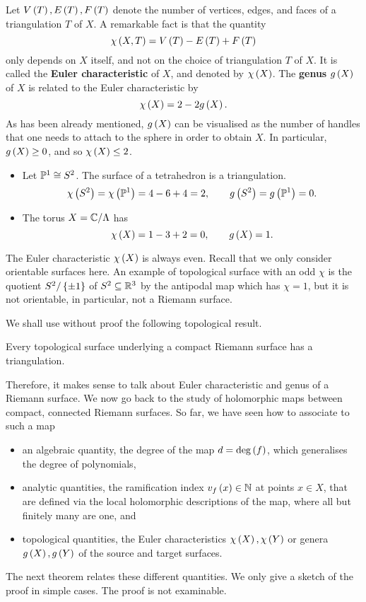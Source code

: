 Let $ V\rb{T}, E\rb{T}, F\rb{T} $ denote the number of vertices, edges, and faces of a triangulation $ T $ of $ X $. A remarkable fact is that the quantity
$$ \chi\rb{X, T} = V\rb{T} - E\rb{T} + F\rb{T} $$
only depends on $ X $ itself, and not on the choice of triangulation $ T $ of $ X $. It is called the \textbf{Euler characteristic} of $ X $, and denoted by $ \chi\rb{X} $. The \textbf{genus} $ g\rb{X} $ of $ X $ is related to the Euler characteristic by
$$ \chi\rb{X} = 2 - 2g\rb{X}. $$
As has been already mentioned, $ g\rb{X} $ can be visualised as the number of handles that one needs to attach to the sphere in order to obtain $ X $. In particular, $ g\rb{X} \ge 0 $, and so $ \chi\rb{X} \le 2 $.

\begin{example*}
\hfill
\begin{itemize}
\item Let $ \P^1 \cong S^2 $. The surface of a tetrahedron is a triangulation.
$$ \chi\rb{S^2} = \chi\rb{\P^1} = 4 - 6 + 4 = 2, \qquad g\rb{S^2} = g\rb{\P^1} = 0. $$
\item The torus $ X = \C / \Lambda $ has
$$ \chi\rb{X} = 1 - 3 + 2 = 0, \qquad g\rb{X} = 1. $$
\end{itemize}
\end{example*}

\begin{remark}
The Euler characteristic $ \chi\rb{X} $ is always even. Recall that we only consider orientable surfaces here. An example of topological surface with an odd $ \chi $ is the quotient $ S^2 / \cb{\pm 1} $ of $ S^2 \subseteq \R^3 $ by the antipodal map which has $ \chi = 1 $, but it is not orientable, in particular, not a Riemann surface.
\end{remark}

We shall use without proof the following topological result.

\begin{theorem}
Every topological surface underlying a compact Riemann surface has a triangulation.
\end{theorem}


Therefore, it makes sense to talk about Euler characteristic and genus of a Riemann surface. We now go back to the study of holomorphic maps between compact, connected Riemann surfaces. So far, we have seen how to associate to such a map
\begin{itemize}
\item an algebraic quantity, the degree of the map $ d = \deg\rb{f} $, which generalises the degree of polynomials,
\item analytic quantities, the ramification index $ v_f\rb{x} \in \N $ at points $ x \in X $, that are defined via the local holomorphic descriptions of the map, where all but finitely many are one, and
\item topological quantities, the Euler characteristics $ \chi\rb{X}, \chi\rb{Y} $ or genera $ g\rb{X}, g\rb{Y} $ of the source and target surfaces.
\end{itemize}
The next theorem relates these different quantities. We only give a sketch of the proof in simple cases. The proof is not examinable.

